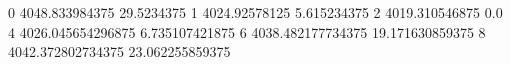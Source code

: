 0 4048.833984375 29.5234375
1 4024.92578125 5.615234375
2 4019.310546875 0.0
4 4026.045654296875 6.735107421875
6 4038.482177734375 19.171630859375
8 4042.372802734375 23.062255859375
